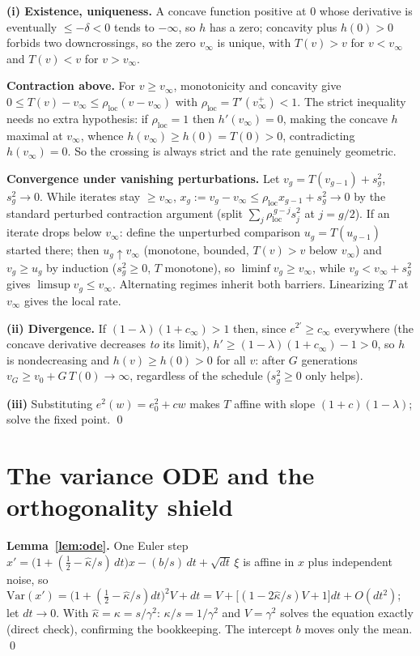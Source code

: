 \documentclass[11pt]{article}
\theoremstyle{remark}
\newcommand{\Var}{\mathrm{Var}}
\begin{document}
\textbf{(i) Existence, uniqueness.} A concave function positive at $0$ whose derivative
is eventually $\le-\delta<0$ tends to $-\infty$, so $h$ has a zero; concavity plus
$h(0)>0$ forbids two downcrossings, so the zero $v_\infty$ is unique, with $T(v)>v$ for
$v<v_\infty$ and $T(v)<v$ for $v>v_\infty$.

\textbf{Contraction above.} For $v\ge v_\infty$, monotonicity and concavity give
$0\le T(v)-v_\infty\le\rho_{\mathrm{loc}}(v-v_\infty)$ with
$\rho_{\mathrm{loc}}=T'(v_\infty^+)<1$. The strict inequality needs no extra
hypothesis: if $\rho_{\mathrm{loc}}=1$ then $h'(v_\infty)=0$, making the concave $h$
maximal at $v_\infty$, whence $h(v_\infty)\ge h(0)=T(0)>0$, contradicting
$h(v_\infty)=0$. So the crossing is always strict and the rate genuinely geometric.

\textbf{Convergence under vanishing perturbations.} Let $v_g=T(v_{g-1})+s^2_g$,
$s^2_g\to0$. While iterates stay $\ge v_\infty$,
$x_g:=v_g-v_\infty\le\rho_{\mathrm{loc}}x_{g-1}+s^2_g\to0$ by the standard perturbed
contraction argument (split $\sum_j\rho_{\mathrm{loc}}^{\,g-j}s^2_j$ at $j=g/2$). If an iterate drops
below $v_\infty$: define the unperturbed comparison $u_g=T(u_{g-1})$ started there; then
$u_g\uparrow v_\infty$ (monotone, bounded, $T(v)>v$ below $v_\infty$) and $v_g\ge u_g$ by
induction ($s^2_g\ge0$, $T$ monotone), so $\liminf v_g\ge v_\infty$, while
$v_g<v_\infty+s^2_g$ gives $\limsup v_g\le v_\infty$. Alternating regimes inherit both
barriers. Linearizing $T$ at $v_\infty$ gives the local rate.

\textbf{(ii) Divergence.} If $(1-\lambda)(1+c_\infty)>1$ then, since $e^{2\prime}\ge
c_\infty$ everywhere (the concave derivative decreases \emph{to} its limit), $h'\ge
(1-\lambda)(1+c_\infty)-1>0$, so $h$ is nondecreasing and $h(v)\ge h(0)>0$ for all $v$:
after $G$ generations $v_G\ge v_0+G\,T(0)\to\infty$, regardless of the schedule
($s^2_g\ge0$ only helps).

\textbf{(iii)} Substituting $e^2(w)=e_0^2+cw$ makes $T$ affine with slope
$(1+c)(1-\lambda)$; solve the fixed point. \qed

\section{The variance ODE and the orthogonality shield}\label{app:ode}

\textbf{Lemma~\ref{lem:ode}.} One Euler step
$x'=\big(1+(\tfrac12-\hat\kappa/s)\,dt\big)x-(b/s)\,dt+\sqrt{dt}\,\xi$ is affine in $x$
plus independent noise, so
$\Var(x')=\big(1+(\tfrac12-\hat\kappa/s)dt\big)^2V+dt
=V+\big[(1-2\hat\kappa/s)V+1\big]dt+O(dt^2)$;
let $dt\to0$. With $\hat\kappa=\kappa=s/\gamma^2$: $\kappa/s=1/\gamma^2$ and
$V=\gamma^2$ solves the equation exactly (direct check), confirming the bookkeeping. The
intercept $b$ moves only the mean. \qed
\end{document}
